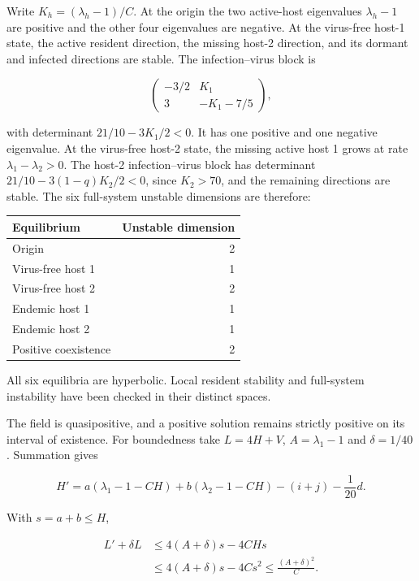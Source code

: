 \documentclass[
  11pt,
]{article}
\newcounter{none} %
\begin{document}
Write \(K_h=(\lambda_h-1)/C\). At the origin the two active-host
eigenvalues \(\lambda_h-1\) are positive and the other four eigenvalues
are negative. At the virus-free host-1 state, the active resident
direction, the missing host-2 direction, and its dormant and infected
directions are stable. The infection--virus block is

\[
\begin{pmatrix}-3/2&K_1\\3&-K_1-7/5\end{pmatrix},
\]

with determinant \(21/10-3K_1/2<0\). It has one positive and one
negative eigenvalue. At the virus-free host-2 state, the missing active
host 1 grows at rate \(\lambda_1-\lambda_2>0\). The host-2
infection--virus block has determinant \(21/10-3(1-q)K_2/2<0\), since
\(K_2>70\), and the remaining directions are stable. The six full-system
unstable dimensions are therefore:

{\def\LTcaptype{none} %
\begin{longtable}[]{@{}lr@{}}
\toprule\noalign{}
Equilibrium & Unstable dimension \\
\midrule\noalign{}
\endhead
\bottomrule\noalign{}
\endlastfoot
Origin & 2 \\
Virus-free host 1 & 1 \\
Virus-free host 2 & 2 \\
Endemic host 1 & 1 \\
Endemic host 2 & 1 \\
Positive coexistence & 2 \\
\end{longtable}
}

All six equilibria are hyperbolic. Local resident stability and
full-system instability have been checked in their distinct spaces.

The field is quasipositive, and a positive solution remains strictly
positive on its interval of existence. For boundedness take \(L=4H+V\),
\(A=\lambda_1-1\) and \(\delta=1/40\). Summation gives

\[
H'=a(\lambda_1-1-CH)+b(\lambda_2-1-CH)-(i+j)-\frac1{20}d.
\]

With \(s=a+b\leq H\),

\[
\begin{aligned}
L'+\delta L
&\leq4(A+\delta)s-4CHs\\
&\leq4(A+\delta)s-4Cs^2
\leq\frac{(A+\delta)^2}{C}.
\end{aligned} \tag{2.11}
\]
\end{document}
